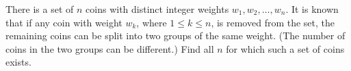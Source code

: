 There is a set of $ n$ coins with distinct integer weights $ w_1, w_2, \ldots , w_n$. It is known that if any coin with weight $ w_k$, where $ 1 \leq k \leq n$, is removed from the set, the remaining coins can be split into two groups of the same weight. (The number of coins in the two groups can be different.) Find all $ n$ for which such a set of coins exists.